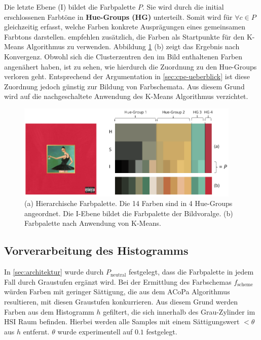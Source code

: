 Die letzte Ebene (I) bildet die Farbpalette $P$. Sie wird durch die initial erschlossenen Farbtöne in \textbf{Hue-Groups (HG)} unterteilt. Somit wird für $\forall c \in P$ gleichzeitig erfasst, welche Farben konkrete Ausprägungen eines gemeinsamen Farbtons darstellen. \citet{acopa} empfehlen zusätzlich, die Farben als Startpunkte für den K-Means Algorithmus zu verwenden. Abbildung \ref{fig:palette} (b) zeigt das Ergebnis nach Konvergenz. Obwohl sich die Clusterzentren den im Bild enthaltenen Farben angenähert haben, ist zu sehen, wie hierdurch die Zuordnung zu den Hue-Groups verloren geht. Entsprechend der Argumentation in \autoref{sec:cpe-ueberblick} ist diese Zuordnung jedoch günstig zur Bildung von Farbschemata. Aus diesem Grund wird auf die nachgeschaltete Anwendung des K-Means Algorithmus verzichtet.

\begin{figure}[]
\centering
\includegraphics[width=0.95\textwidth]{img/palette.png}
\caption{(a) Hierarchische Farbpalette. Die 14 Farben sind in 4 Hue-Groups angeordnet. Die I-Ebene bildet die Farbpalette der Bildvoralge. (b) Farbpalette nach Anwendung von K-Means.}
\label{fig:palette}
\end{figure}

\subsection{Vorverarbeitung des Histogramms}
\label{sec:vorverarbeitung}

In \autoref{sec:architektur} wurde durch $P_\text{neutral}$ festgelegt, dass die Farbpalette in jedem Fall durch Graustufen ergänzt wird. Bei der Ermittlung des Farbschemas $f_\text{scheme}$ würden Farben mit geringer Sättigung, die aus dem ACoPa Algorithmus resultieren, mit diesen Graustufen konkurrieren. Aus diesem Grund werden Farben aus dem Histogramm $h$ gefiltert, die sich innerhalb des \glqq{}Grau-Zylinder\grqq{} \citep{acopa} im HSI Raum befinden. Hierbei werden alle Samples mit einem Sättigungswert $< \theta$ aus $h$ entfernt. $\theta$ wurde experimentell auf $0.1$ festgelegt.


